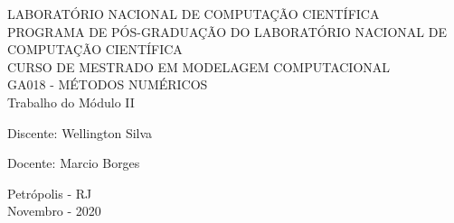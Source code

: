 \begin{center} 
    {\large LABORATÓRIO NACIONAL DE COMPUTAÇÃO CIENTÍFICA}
    \\[0.2cm] 
    {\large PROGRAMA DE PÓS-GRADUAÇÃO DO LABORATÓRIO NACIONAL DE COMPUTAÇÃO CIENTÍFICA}
    \\[0.2cm]
    {\large CURSO DE MESTRADO EM MODELAGEM COMPUTACIONAL}
    \\[0.2cm]
    {\large GA018 - MÉTODOS NUMÉRICOS}
    \\[6.5cm] 
    { \huge Trabalho do Módulo II}
    \\[6.5cm]
\end{center}

{\large Discente: Wellington Silva}

{\large Docente: Marcio Borges}\\[2cm]

\begin{center}
    {\large Petrópolis - RJ}
    \\[0.2cm]
    {\large Novembro - 2020}
\end{center}
